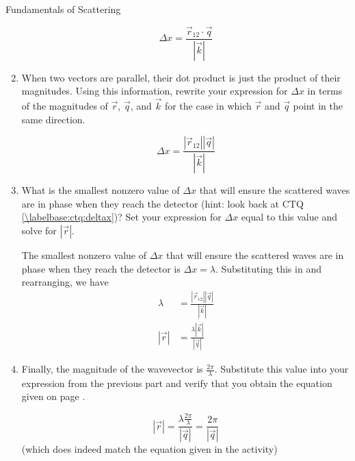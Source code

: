 \begin{activity}{Fundamentals of Scattering}
\begin{exercises}
\begin{enumerate}
				\begin{solution}{}
					\begin{equation*}
						\Delta x = \frac{\vec r_{12} \cdot \vec q}{|\vec k|}
					\end{equation*}
				\end{solution}
			
			\item When two vectors are parallel, their dot product is just the product of their magnitudes.  Using this information, rewrite your expression for $\Delta x$ in terms of the magnitudes of $\vec r$, $\vec q$, and $\vec k$ for the case in which $\vec r$ and $\vec q$ point in the same direction.
			
				\begin{solution}{}
					\begin{equation*}
						\Delta x = \frac{|\vec r_{12}| |\vec q|}{|\vec k|}
					\end{equation*}
				\end{solution}
			
			\item What is the smallest nonzero value of $\Delta x$ that will ensure the scattered waves are in phase when they reach the detector (hint: look back at CTQ \ref{\labelbase:ctq:deltax})?  Set your expression for $\Delta x$ equal to this value and solve for $|\vec r|$.
			
				\begin{solution}{}
					The smallest nonzero value of $\Delta x$ that will ensure the scattered waves are in phase when they reach the detector is $\Delta x=\lambda$.  Substituting this in and rearranging, we have
					\begin{align*}
						\lambda &= \frac{|\vec r_{12}| |\vec q|}{|\vec k|}\\
						|\vec r| &= \frac{\lambda |\vec k|}{|\vec q|}
					\end{align*}
				\end{solution}
			
			\item Finally, the magnitude of the wavevector is $\frac{2\pi}{\lambda}$.  Substitute this value into your expression from the previous part and verify that you obtain the equation given on page \pageref{\labelbase:eqn:rq}.
			
				\begin{solution}{}
					\begin{equation*}
						|\vec r| = \frac{\lambda \frac{2\pi}{\lambda}}{|\vec q|} = \frac{2\pi}{|\vec q|}
					\end{equation*}
					(which does indeed match the equation given in the activity)
				\end{solution}
			

\end{enumerate}
\end{exercises}
\end{activity}
